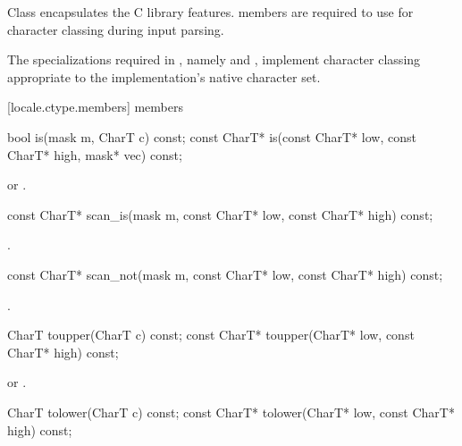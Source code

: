 \pnum
Class  encapsulates the C library  features.
 members are required to use 
for character classing during input parsing.

\pnum
The specializations
required in ,
namely  and ,
implement character classing appropriate
to the implementation's native character set.

[locale.ctype.members]{ members}

%
\begin{itemdecl}
bool         is(mask m, CharT c) const;
const CharT* is(const CharT* low, const CharT* high, mask* vec) const;
\end{itemdecl}

\begin{itemdescr}
\pnum
\returns
{} or .
\end{itemdescr}

%
\begin{itemdecl}
const CharT* scan_is(mask m, const CharT* low, const CharT* high) const;
\end{itemdecl}

\begin{itemdescr}
\pnum
\returns
{}.
\end{itemdescr}

%
\begin{itemdecl}
const CharT* scan_not(mask m, const CharT* low, const CharT* high) const;
\end{itemdecl}

\begin{itemdescr}
\pnum
\returns
{}.
\end{itemdescr}

%
\begin{itemdecl}
CharT        toupper(CharT c) const;
const CharT* toupper(CharT* low, const CharT* high) const;
\end{itemdecl}

\begin{itemdescr}
\pnum
\returns
{} or .
\end{itemdescr}

%
\begin{itemdecl}
CharT        tolower(CharT c) const;
const CharT* tolower(CharT* low, const CharT* high) const;
\end{itemdecl}


